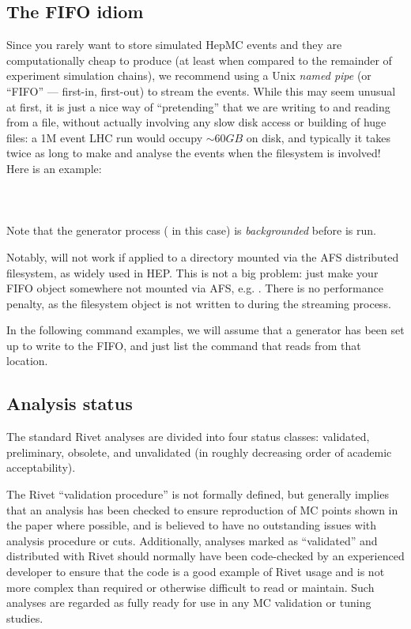 \subsection{The FIFO idiom}
\label{sec:fifo-idiom}

Since you rarely want to store simulated HepMC events and they are
computationally cheap to produce (at least when compared to the remainder of
experiment simulation chains), we recommend using a Unix \emph{named pipe} (or
``FIFO'' --- first-in, first-out) to stream the events. While this may seem
unusual at first, it is just a nice way of ``pretending'' that we are writing to
and reading from a file, without actually involving any slow disk access or
building of huge files: a 1M event LHC run would occupy $\sim 60 GB$ on disk,
and typically it takes twice as long to make and analyse the events when the
filesystem is involved! Here is an example:\\
\\
\\
\\
%
Note that the generator process ( in this case) is
\emph{backgrounded} before  is run.

Notably,  will not work if applied to a directory mounted via the
AFS distributed filesystem, as widely used in HEP. This is not a big problem:
just make your FIFO object somewhere not mounted via AFS, e.g. . There
is no performance penalty, as the filesystem object is not written to during the
streaming process.

In the following command examples, we will assume that a generator has been set
up to write to the  FIFO, and just list the  command
that reads from that location. %


\subsection{Analysis status}

The standard Rivet analyses are divided into four status classes: validated,
preliminary, obsolete, and unvalidated (in roughly decreasing order of academic
acceptability).

The Rivet ``validation procedure'' is not formally
defined, but generally implies that an analysis has been checked to ensure
reproduction of MC points shown in the paper where possible, and is believed to
have no outstanding issues with analysis procedure or cuts.  Additionally,
analyses marked as ``validated'' and distributed with Rivet should normally have
been code-checked by an experienced developer to ensure that the code is a good
example of Rivet usage and is not more complex than required or otherwise
difficult to read or maintain. Such analyses are regarded as fully ready for use
in any MC validation or tuning studies.

